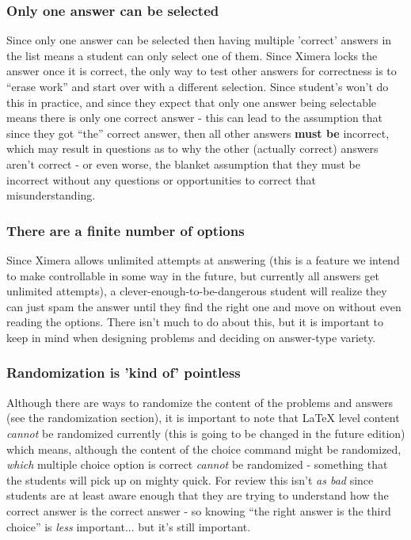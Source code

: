\documentclass{ximera}
\begin{document}
        
        \subsubsection*{Only one answer can be selected}
            Since only one answer can be selected then having multiple 'correct' answers in the list means a student can only select one of them. Since Ximera locks the answer once it is correct, the only way to test other answers for correctness is to ``erase work'' and start over with a different selection. Since student's won't do this in practice, and since they expect that only one answer being selectable means there is only one correct answer - this can lead to the assumption that since they got ``the'' correct answer, then all other answers \textbf{must be} incorrect, which may result in questions as to why the other (actually correct) answers aren't correct - or even worse, the blanket assumption that they must be incorrect without any questions or opportunities to correct that misunderstanding.
            
        \subsubsection*{There are a finite number of options}
            Since Ximera allows unlimited attempts at answering (this is a feature we intend to make controllable in some way in the future, but currently all answers get unlimited attempts), a clever-enough-to-be-dangerous student will realize they can just spam the answer until they find the right one and move on without even reading the options. There isn't much to do about this, but it is important to keep in mind when designing problems and deciding on answer-type variety.
            
        \subsubsection*{Randomization is 'kind of' pointless}
            Although there are ways to randomize the content of the problems and answers (see the randomization section), it is important to note that LaTeX level content \textit{cannot} be randomized currently (this is going to be changed in the future edition) which means, although the content of the choice command might be randomized, \textit{which} multiple choice option is correct \textit{cannot} be randomized - something that the students will pick up on mighty quick. For review this isn't \textit{as bad} since students are at least aware enough that they are trying to understand how the correct answer is the correct answer - so knowing ``the right answer is the third choice'' is \textit{less} important... but it's still important.
            
        
\end{document}
